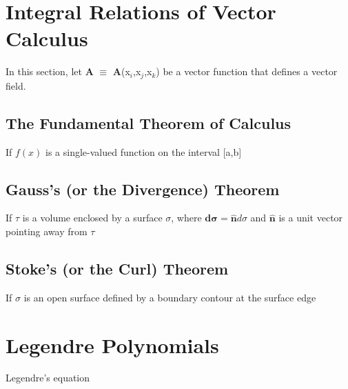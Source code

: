 \section{Integral Relations of Vector Calculus}
In this section, let \textbf{A} $\equiv$ \textbf{A}(x$_i$,x$_j$,x$_k$) be a vector function that defines a vector field. \\

\subsection{The Fundamental Theorem of Calculus}
If $f(x)$ is a single-valued function on the interval [a,b] 

\subsection{Gauss's (or the Divergence) Theorem}
If $\tau$ is a volume enclosed by a surface $\sigma$, where $\boldsymbol{d \sigma} = \boldsymbol{\hat{n}} d\sigma$ and $\boldsymbol{\hat{n}}$ is a unit vector pointing away from $\tau$ 

\subsection{Stoke's (or the Curl) Theorem}
If $\sigma$ is an open surface defined by a boundary contour at the surface edge 


\section{Legendre Polynomials}

\noindent
Legendre's equation 

